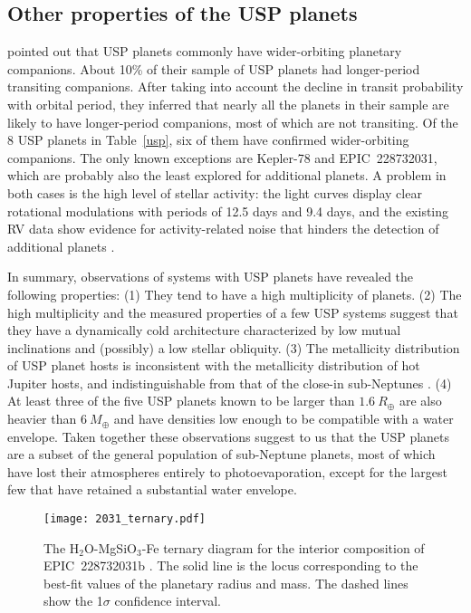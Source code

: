 \documentclass[twocolumn]{aastex61}
\begin{document}
\subsection{Other properties of the USP planets}

\citet{Sanchis-Ojeda_usp} pointed out that USP planets commonly have wider-orbiting planetary companions.
About 10\% of their sample of USP planets had longer-period transiting companions. After taking into
account the decline in transit probability with orbital period,
they inferred that nearly all the planets in their sample are likely to have longer-period companions, most of which are not transiting.  Of the 8 USP planets in Table~\ref{usp}, six of them have confirmed wider-orbiting
companions. The only known exceptions are Kepler-78 and EPIC~228732031, which are
probably also the least explored for additional planets. A problem in both cases is the high level of stellar
activity:
the light curves display clear rotational modulations with periods of 12.5 days and 9.4 days,
and the existing RV data show evidence for activity-related noise that hinders
the detection of additional planets \citep{Sanchis-Ojedak78,Howard2013}.

In summary, observations of systems with USP planets have revealed the following properties:
(1) They tend to have a high multiplicity of planets.
(2) The high multiplicity and the measured
properties of a few USP systems suggest that they
have a dynamically cold architecture characterized by low mutual inclinations and (possibly) a low stellar obliquity.
(3) The metallicity distribution of USP planet hosts is inconsistent with the metallicity distribution of hot Jupiter hosts,
and indistinguishable from that of the close-in sub-Neptunes \citep{Winn2017}.
(4) At least three of the five USP planets
known to be larger than $1.6~R_{\oplus}$ are
also heavier than $6~M_{\oplus}$ and have densities
low enough to be compatible with a water envelope.
Taken together these observations suggest to us
that the USP planets are a subset of the general
population of sub-Neptune planets, most of which have lost their atmospheres entirely to photoevaporation, except
for the largest few that have retained a substantial water envelope.

\begin{figure}[!t]
\begin{center}
\texttt{[image: 2031\_ternary.pdf]}
\caption{The H$_2$O-MgSiO$_3$-Fe ternary diagram for the interior composition of EPIC~228732031b \citep{Zeng2016}. The solid line is the locus corresponding to the best-fit values of the planetary radius and mass. The dashed lines show the 1$\sigma$ confidence interval.}
\label{ternary}
\end{center}
\end{figure}
\end{document}
